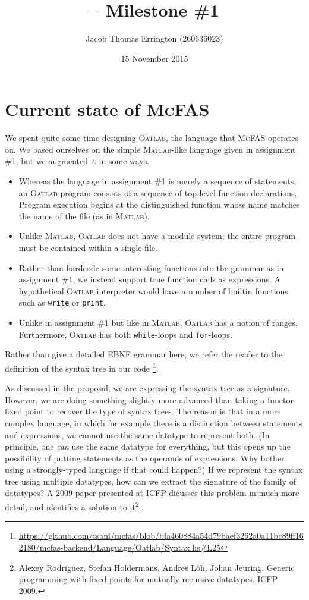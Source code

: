 \documentclass[letterpaper,11pt]{article}
\author{Jacob Thomas Errington (260636023)}
\title{\mcfas{} -- Milestone \#1}
\date{15 November 2015}
\newcommand{\mcfas}{\textsc{McFAS}}
\newcommand{\matlab}{\textsc{Matlab}}
\newcommand{\oatlab}{\textsc{Oatlab}}
\newcommand{\codesnip}{\texttt}
\begin{document}
\maketitle

\section{Current state of \mcfas{}}

We spent quite some time designing \oatlab{}, the language that \mcfas{}
operates on. We based ourselves on the simple \matlab{}-like language given in
assignment \#1, but we augmented it in some ways.

\begin{itemize}
  \item
    Whereas the language in assignment \#1 is merely a sequence of statements,
    an \oatlab{} program consists of a sequence of top-level function
    declarations. Program execution begins at the distinguished function whose
    name matches the name of the file (as in \matlab{}).

  \item
    Unlike \matlab{}, \oatlab{} does not have a module system; the entire
    program must be contained within a single file.

  \item
    Rather than hardcode some interesting functions into the grammar as in
    assignment \#1, we instead support true function calls as expressions. A
    hypothetical \oatlab{} interpreter would have a number of builtin functions
    such as \codesnip{write} or \codesnip{print}.

  \item
    Unlike in assignment \#1 but like in \matlab{}, \oatlab{} has a notion of
    ranges. Furthermore, \oatlab{} has both \codesnip{while}-loops and
    \codesnip{for}-loops.
\end{itemize}

Rather than give a detailed EBNF grammar here, we refer the reader to the
definition of the syntax tree in our code
\footnote{\url{https://github.com/tsani/mcfas/blob/bfa460884a54d79baef3262a0a11bc89ff162180/mcfas-backend/Language/Oatlab/Syntax.hs\#L25}}.

As discussed in the proposal, we are expressing the syntax tree as a signature.
However, we are doing something slightly more advanced than taking a functor
fixed point to recover the type of syntax trees. The reason is that in a more
complex language, in which for example there is a distinction between
statements and expressions, we cannot use the same datatype to represent both.
(In principle, one \emph{can} use the same datatype for everything, but this
opens up the possibility of putting statements as the operands of expressions.
Why bother using a strongly-typed language if that could happen?)
If we represent the syntax tree using multiple datatypes, how can we extract
the signature of the family of datatypes? A 2009 paper presented
at ICFP dicusses this problem in much more detail, and identifies a solution to
it\footnote{
  Alexey Rodriguez, Stefan Holdermans, Andres Löh, Johan Jeuring. Generic
  programming with fixed points for mutually recursive datatypes. ICFP 2009.
}.
\end{document}
